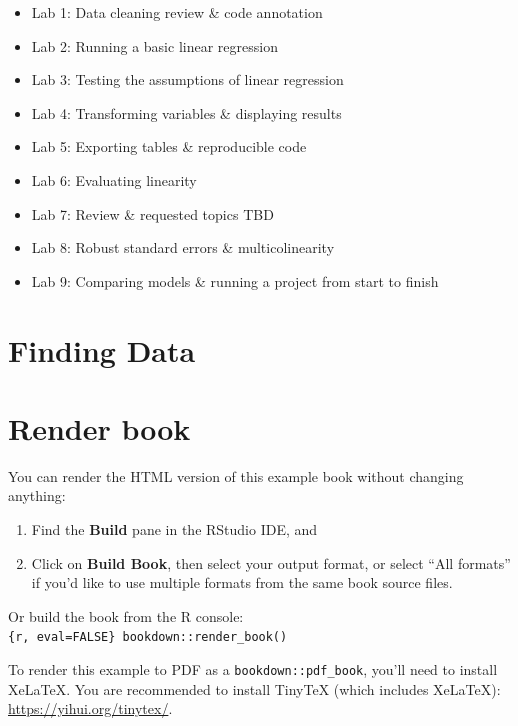 \documentclass[
]{book}
\providecommand{\tightlist}{%
  \setlength{\itemsep}{0pt}\setlength{\parskip}{0pt}}
\begin{document}
\begin{itemize}
\tightlist
\item
  Lab 1: Data cleaning review \& code annotation
\item
  Lab 2: Running a basic linear regression\\
\item
  Lab 3: Testing the assumptions of linear regression\\
\item
  Lab 4: Transforming variables \& displaying results
\item
  Lab 5: Exporting tables \& reproducible code
\item
  Lab 6: Evaluating linearity
\item
  Lab 7: Review \& requested topics TBD
\item
  Lab 8: Robust standard errors \& multicolinearity
\item
  Lab 9: Comparing models \& running a project from start to finish
\end{itemize}

\hypertarget{finding-data}{%
\section{Finding Data}\label{finding-data}}

\hypertarget{render-book}{%
\section{Render book}\label{render-book}}

You can render the HTML version of this example book without changing anything:

\begin{enumerate}
\def\labelenumi{\arabic{enumi}.}
\item
  Find the \textbf{Build} pane in the RStudio IDE, and
\item
  Click on \textbf{Build Book}, then select your output format, or select ``All formats'' if you'd like to use multiple formats from the same book source files.
\end{enumerate}

Or build the book from the R console:\texttt{\{r,\ eval=FALSE\}\ bookdown::render\_book()}

To render this example to PDF as a \texttt{bookdown::pdf\_book}, you'll need to install XeLaTeX. You are recommended to install TinyTeX (which includes XeLaTeX): \url{https://yihui.org/tinytex/}.
\end{document}
